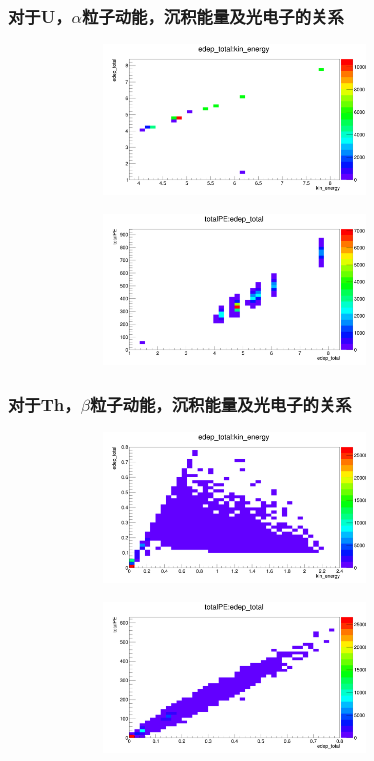 \begin{frame}
    \frametitle{对于U，$\alpha$粒子动能，沉积能量及光电子的关系}
    \includegraphics[width=12cm,height=4cm]{data/U_alpha_edep_vs_kine.png}

    \includegraphics[width=12cm,height=4cm]{data/U_alpha_totalPE_vs_edep.png}
\end{frame}

\begin{frame}
    \frametitle{对于Th，$\beta$粒子动能，沉积能量及光电子的关系}
    \includegraphics[width=12cm,height=4cm]{data/Th_beta_edep_vs_kine.png}

    \includegraphics[width=12cm,height=4cm]{data/Th_beta_totalPE_vs_edep.png}
\end{frame}


